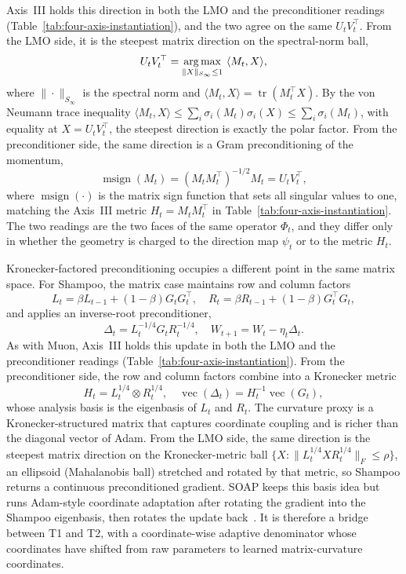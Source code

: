 Axis~III holds this direction in both the LMO and the preconditioner readings
(Table~\ref{tab:four-axis-instantiation}), and the two agree on the same
$U_tV_t^\top$.  From the LMO side, it is the steepest matrix direction on the
spectral-norm ball,
\begin{equation}
  U_tV_t^\top = \operatorname*{arg\,max}_{\|X\|_{S_\infty}\le 1}\ \langle M_t,X\rangle,
\end{equation}
where $\|\cdot\|_{S_\infty}$ is the spectral norm and
$\langle M_t,X\rangle=\operatorname{tr}(M_t^\top X)$.  By the von Neumann trace
inequality $\langle M_t,X\rangle\le\sum_i\sigma_i(M_t)\sigma_i(X)\le\sum_i\sigma_i(M_t)$,
with equality at $X=U_tV_t^\top$, the steepest direction is exactly the polar
factor.  From the preconditioner side, the same direction is a Gram
preconditioning of the momentum,
\begin{equation}
  \operatorname{msign}(M_t)=(M_tM_t^\top)^{-1/2}M_t=U_tV_t^\top ,
\end{equation}
where $\operatorname{msign}(\cdot)$ is the matrix sign function that sets all
singular values to one, matching the Axis~III metric $H_t=M_tM_t^\top$ in
Table~\ref{tab:four-axis-instantiation}.  The two readings are the two faces of
the same operator $\Phi_t$, and they differ only in whether the geometry is
charged to the direction map $\psi_t$ or to the metric $H_t$.

Kronecker-factored preconditioning occupies a different point in the same
matrix space.  For Shampoo, the matrix case maintains row and column factors
\begin{equation}
  L_t=\beta L_{t-1}+(1-\beta)G_tG_t^\top,\quad
  R_t=\beta R_{t-1}+(1-\beta)G_t^\top G_t,
  \label{eq:t2-shampoo-factors}
\end{equation}
and applies an inverse-root preconditioner,
\begin{equation}
  \Delta_t = L_t^{-1/4}G_tR_t^{-1/4},\quad W_{t+1}=W_t-\eta_t\Delta_t .
  \label{eq:t2-shampoo-update}
\end{equation}
As with Muon, Axis~III holds this update in both the LMO and the preconditioner
readings (Table~\ref{tab:four-axis-instantiation}).  From the preconditioner
side, the row and column factors combine into a Kronecker metric
\begin{equation}
  H_t = L_t^{1/4}\otimes R_t^{1/4},\quad
  \operatorname{vec}(\Delta_t)=H_t^{-1}\operatorname{vec}(G_t),
\end{equation}
whose analysis basis is the eigenbasis of $L_t$ and $R_t$.  The curvature proxy
is a Kronecker-structured matrix that captures coordinate coupling and is richer
than the diagonal vector of Adam.  From the LMO side, the same direction is the
steepest matrix direction on the Kronecker-metric ball
$\{X:\|L_t^{1/4}XR_t^{1/4}\|_F\le\rho\}$, an ellipsoid (Mahalanobis ball)
stretched and rotated by that metric, so Shampoo returns a continuous
preconditioned gradient.
SOAP keeps this basis idea but runs Adam-style coordinate adaptation after
rotating the gradient into the Shampoo eigenbasis, then rotates the update
back~\citep{vyas2025soap}.  It is therefore a bridge between T1 and T2, with a
coordinate-wise adaptive denominator whose coordinates have shifted from raw
parameters to learned matrix-curvature coordinates.

